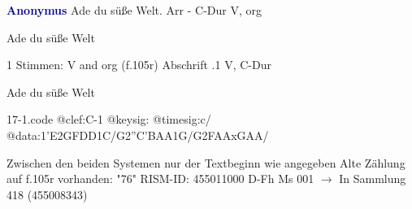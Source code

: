 \documentclass[twocolumn]{book}
\begin{document}
\newline \par \vspace{7pt} \textcolor{darkblue}{\textbf{Anonymus  }}
\newline Ade du süße Welt. Arr - C-Dur
\newline V, org
\newline \begin{itshape} Ade du süße Welt\end{itshape} 
\newline \textcolor{darkblue}{}  1 Stimmen: V and org  (f.105r)
\newline Abschrift
.1  V, C-Dur
\newline \begin{footnotesize} Ade du süße Welt \end{footnotesize}  
\begin{filecontents*}{17-1.code}
@clef:C-1
@keysig:
@timesig:c/
@data:1'E2GFDD1C/G2''C'BAA1G/G2FAAxGAA/
\end{filecontents*}
\newline
%
\newline Zwischen den beiden Systemen nur der Textbeginn wie angegeben
\newline Alte Zählung auf f.105r vorhanden: "76"
\newline RISM-ID: 455011000
\newline D-Fh  Ms 001
\newline $\rightarrow$ In Sammlung 418 (455008343)
      
\end{document}

